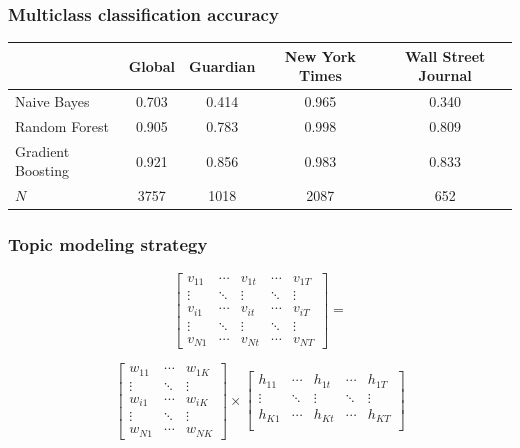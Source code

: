 \documentclass[11pt]{beamer}
\begin{document}

\begin{frame}
\frametitle{Multiclass classification accuracy}

\begin{table}
\centering
\scriptsize 
\begin{tabular}{lcccc}
\toprule
				& Global		& Guardian 	& New York Times	& Wall Street Journal	\\ 
\midrule
Naive Bayes 		& 0.703		& 0.414		& 0.965	 		& 0.340				\\
Random Forest		& 0.905		& 0.783		& 0.998			& 0.809 				\\ 
Gradient Boosting	& 0.921		& 0.856		& 0.983			& 0.833				\\ 
$N$				& 3757    		& 1018		& 2087 			& 652	 			\\
\bottomrule
\end{tabular}
\end{table}

\end{frame}


\begin{frame}
\frametitle{Topic modeling strategy}

\[
\begin{bmatrix}
        		v_{11} & \cdots & v_{1t} & \cdots & v_{1T} \\
		\vdots & \ddots & \vdots & \ddots & \vdots\\
		v_{i1} & \cdots & v_{it} & \cdots & v_{iT} \\
        		\vdots & \ddots & \vdots & \ddots & \vdots\\
        		v_{N1} & \cdots & v_{Nt} & \cdots & v_{NT}
\end{bmatrix}
=
\]

\[
\begin{bmatrix}
        		w_{11} & \cdots & w_{1K} \\
		\vdots & \ddots & \vdots \\
		w_{i1} & \cdots & w_{iK} \\
        		\vdots & \ddots & \vdots\\
        		w_{N1} & \cdots & w_{NK}
\end{bmatrix}
\times 
\begin{bmatrix}
        		h_{11} & \cdots & h_{1t} & \cdots & h_{1T} \\
		\vdots & \ddots & \vdots & \ddots & \vdots\\
		h_{K1} & \cdots & h_{Kt} & \cdots & h_{KT} \\
\end{bmatrix}
\]

\end{frame}
\end{document}
